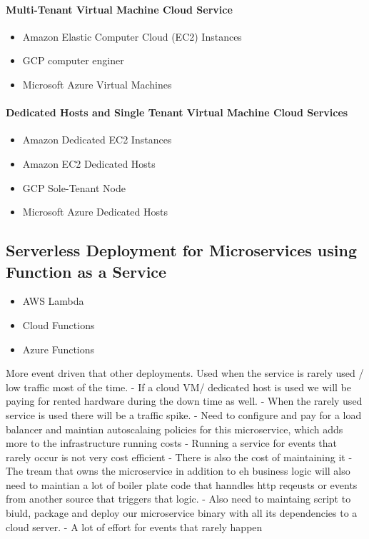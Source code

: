 \documentclass[a4paper, 11pt]{book}
\begin{document}
{    \paragraph{Multi-Tenant Virtual Machine Cloud Service}
    \begin{itemize}
        \item Amazon Elastic Computer Cloud (EC2) Instances
        \item GCP computer enginer
        \item Microsoft Azure Virtual Machines
    \end{itemize}

    \paragraph{Dedicated Hosts and Single Tenant Virtual Machine Cloud Services}
    \begin{itemize}
        \item Amazon Dedicated EC2 Instances
        \item Amazon EC2 Dedicated Hosts
        \item GCP Sole-Tenant Node
        \item Microsoft Azure Dedicated Hosts
    \end{itemize}

    \subsection{Serverless Deployment for Microservices using Function as a Service}

    \begin{itemize}
        \item AWS Lambda
        \item Cloud Functions
        \item Azure Functions
    \end{itemize}

    More event driven that other deployments.
    Used when the service is rarely used / low traffic most of the time.
    - If a cloud VM/ dedicated host is used we will be paying for rented hardware during the down time as well.
    - When the rarely used service is used there will be a traffic spike.
    - Need to configure and pay for a load balancer and maintian autoscalaing policies for this microservice, which adds more to the infrastructure running costs
    - Running a service for events that rarely occur is not very cost efficient
    - There is also the cost of maintaining it
    - The tream that owns the microservice in addition to eh business logic will also need to maintian a lot of boiler plate code that hanndles http reqeusts or events from another source that triggers that logic.
    - Also need to maintaing script to biuld, package and deploy our microservice binary with all its dependencies to a cloud server.
    - A lot of effort for events that rarely happen

}
\end{document}

